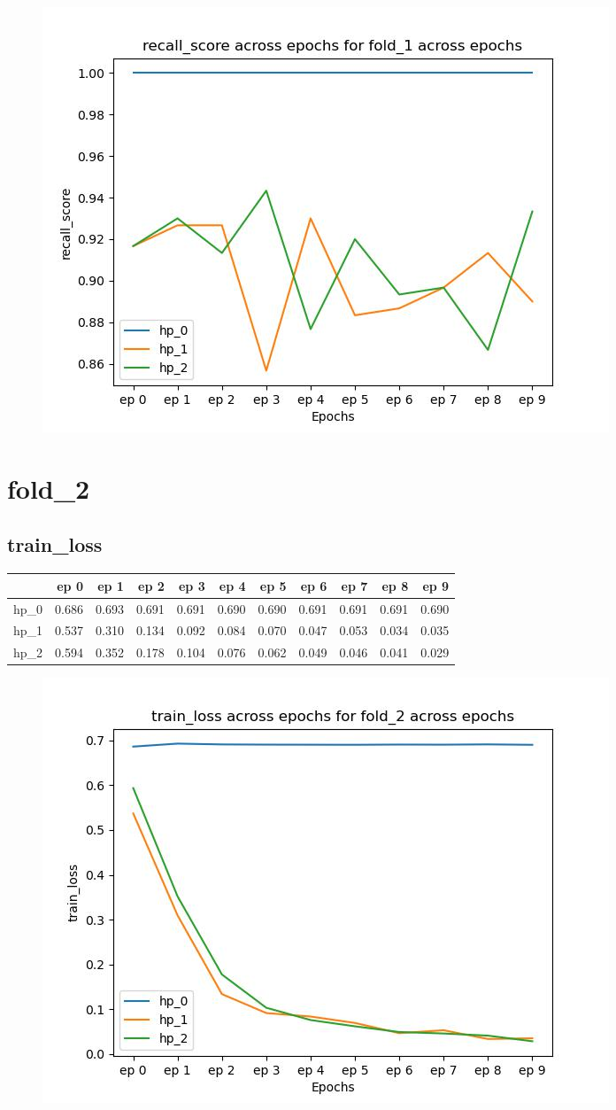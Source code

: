\documentclass{article}
\begin{document}
\begin{figure}[H]
\includegraphics[scale = 0.75]{fold_1/recall_score}
\end{figure}
\section{fold\_2}
\subsection{train\_loss}
\begin{tabular}{lrrrrrrrrrr}
\toprule
{} &   ep 0 &   ep 1 &   ep 2 &   ep 3 &   ep 4 &   ep 5 &   ep 6 &   ep 7 &   ep 8 &   ep 9 \\
\midrule
hp\_0 &  0.686 &  0.693 &  0.691 &  0.691 &  0.690 &  0.690 &  0.691 &  0.691 &  0.691 &  0.690 \\
hp\_1 &  0.537 &  0.310 &  0.134 &  0.092 &  0.084 &  0.070 &  0.047 &  0.053 &  0.034 &  0.035 \\
hp\_2 &  0.594 &  0.352 &  0.178 &  0.104 &  0.076 &  0.062 &  0.049 &  0.046 &  0.041 &  0.029 \\
\bottomrule
\end{tabular}

\begin{figure}[H]
\includegraphics[scale = 0.75]{fold_2/train_loss}
\end{figure}
\end{document}
